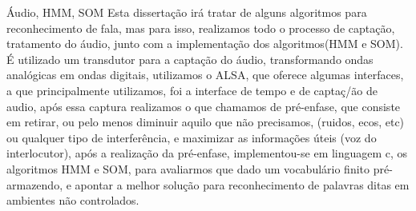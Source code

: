 \begin{resumo}{Áudio, HMM, SOM }
\label{sec:resumo}
\quad Esta dissertação irá tratar de alguns algoritmos para reconhecimento de fala, mas para isso, realizamos todo o processo de captação, tratamento do áudio, junto com a implementação dos algoritmos(HMM e SOM). É utilizado um transdutor para a captação do áudio, transformando  ondas analógicas em ondas digitais, utilizamos o ALSA, que oferece algumas interfaces, a que principalmente utilizamos, foi a interface de tempo e de captaç/ão de audio, após essa captura realizamos o que chamamos de pré-enfase, que consiste em retirar, ou pelo menos diminuir aquilo que não precisamos, (ruidos, ecos, etc) ou qualquer tipo de interferência, e maximizar as informações úteis (voz do interlocutor), após a realização da pré-enfase, implementou-se em linguagem c, os algoritmos HMM e SOM, para avaliarmos que dado um vocabulário finito pré-armazendo, e apontar a melhor solução para reconhecimento de palavras ditas em ambientes não controlados.\\


\end{resumo}